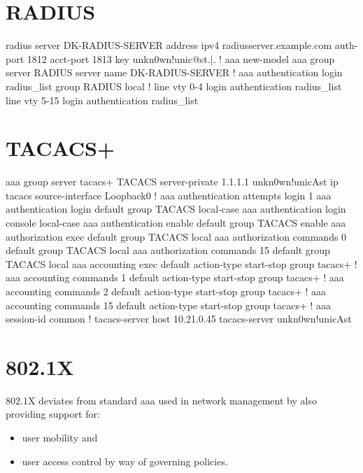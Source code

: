 \newpage

\section{RADIUS}


\begin{txt}
radius server DK-RADIUS-SERVER
 address ipv4 radiusserver.example.com auth-port 1812 acct-port 1813
 key unkn0wn!unic@st.|.
!
aaa new-model
aaa group server RADIUS
 server name DK-RADIUS-SERVER
!
aaa authentication login radius_list group RADIUS local
!
line vty 0-4
 login authentication radius_list
line vty 5-15
 login authentication radius_list
\end{txt}

\newpage

\section{TACACS+}


\begin{txt}
aaa group server tacacs+ TACACS
server-private 1.1.1.1 unkn0wn!unicAst
ip tacacs source-interface Loopback0
!
aaa authentication attempts login 1
aaa authentication login default group TACACS local-case
aaa authentication login console local-case
aaa authentication enable default group TACACS enable
aaa authorization exec default group TACACS local 
aaa authorization commands 0 default group TACACS local 
aaa authorization commands 15 default group TACACS local 
aaa accounting exec default
 action-type start-stop
 group tacacs+
!
aaa accounting commands 1 default
 action-type start-stop
 group tacacs+
!
aaa accounting commands 2 default
 action-type start-stop
 group tacacs+
!
aaa accounting commands 15 default
 action-type start-stop
 group tacacs+
!
aaa session-id common
!
tacacs-server host 10.21.0.45
tacacs-server unkn0wn!unicAst
\end{txt}

\section{802.1X}

802.1X deviates from standard \gls{aaa} used in network management by also providing support for:
\begin{itemize}
    \item user mobility and
    \item user access control by way of governing policies.
\end{itemize}

